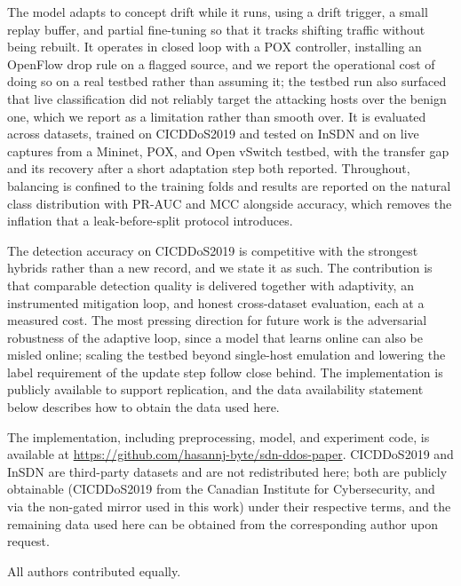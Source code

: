 \documentclass[ASNA,twocolumn]{USG} %
\begin{document}
The model adapts to concept drift while it runs, using a drift trigger, a small replay buffer, and partial fine-tuning so that it tracks shifting traffic without being rebuilt. It operates in closed loop with a POX controller, installing an OpenFlow drop rule on a flagged source, and we report the operational cost of doing so on a real testbed rather than assuming it; the testbed run also surfaced that live classification did not reliably target the attacking hosts over the benign one, which we report as a limitation rather than smooth over. It is evaluated across datasets, trained on CICDDoS2019 and tested on InSDN and on live captures from a Mininet, POX, and Open vSwitch testbed, with the transfer gap and its recovery after a short adaptation step both reported. Throughout, balancing is confined to the training folds and results are reported on the natural class distribution with PR-AUC and MCC alongside accuracy, which removes the inflation that a leak-before-split protocol introduces.

The detection accuracy on CICDDoS2019 is competitive with the strongest hybrids rather than a new record, and we state it as such. The contribution is that comparable detection quality is delivered together with adaptivity, an instrumented mitigation loop, and honest cross-dataset evaluation, each at a measured cost. The most pressing direction for future work is the adversarial robustness of the adaptive loop, since a model that learns online can also be misled online; scaling the testbed beyond single-host emulation and lowering the label requirement of the update step follow close behind. The implementation is publicly available to support replication, and the data availability statement below describes how to obtain the data used here.



\clearpage
{}

The implementation, including preprocessing, model, and experiment code, is available at \url{https://github.com/hasannj-byte/sdn-ddos-paper}. CICDDoS2019 and InSDN are third-party datasets and are not redistributed here; both are publicly obtainable (CICDDoS2019 from the Canadian Institute for Cybersecurity, and via the non-gated mirror used in this work) under their respective terms, and the remaining data used here can be obtained from the corresponding author upon request.


All authors contributed equally.
\end{document}
